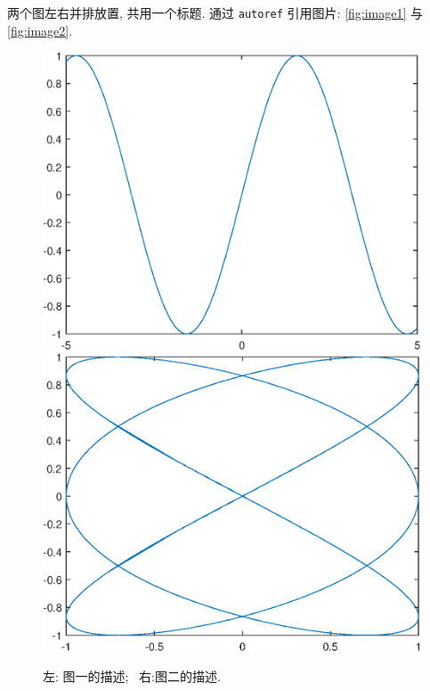 \documentclass[UTF8,openany,twoside,12pt]{book}
\theoremstyle{plain}
\begin{document}
\clearpage
两个图左右并排放置, 共用一个标题. 通过 \verb|autoref| 引用图片: \autoref{fig:image1} 与 \autoref{fig:image2}.
\begin{figure}[htp!]
\centering
  \includegraphics[width=0.48\linewidth]{image1.eps}
  \hfill
  \includegraphics[width=0.48\linewidth]{image2.eps}
  \caption{左: 图一的描述;~ 右:图二的描述.}
  \label{fig:image}
\end{figure}
\end{document}
